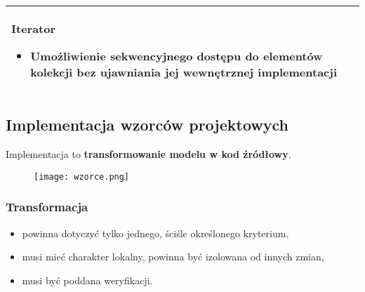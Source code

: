 \documentclass[a4paper]{article}
\begin{document}
\begin{table}[H]
\begin{center}
\begin{tabular}{  p{8cm} c  }
                \cmidrule(r){1-1}\cmidrule(l){2-2}
                \textbf{Iterator}
                \begin{itemize}
                    \item Umożliwienie \textbf{sekwencyjnego dostępu} do elementów kolekcji bez ujawniania jej wewnętrznej implementacji
                \end{itemize}
                &
                \raisebox{-\totalheight}{\texttt{[image: iterator.png]}}
                \\

                \bottomrule
            \end{tabular}
        \end{center}
    \end{table}


    \subsection{Implementacja wzorców projektowych}
    Implementacja to \textbf{transformowanie modelu w kod źródłowy}.

    \begin{figure}[H]
        \texttt{[image: wzorce.png]}
    \end{figure}

    \subsubsection{Transformacja}
    \begin{itemize}
        \item powinna dotyczyć tylko jednego, ściśle określonego kryterium,
        \item musi mieć charakter lokalny, powinna być izolowana od innych zmian,
        \item musi być poddana weryfikacji.
    \end{itemize}
\end{document}
